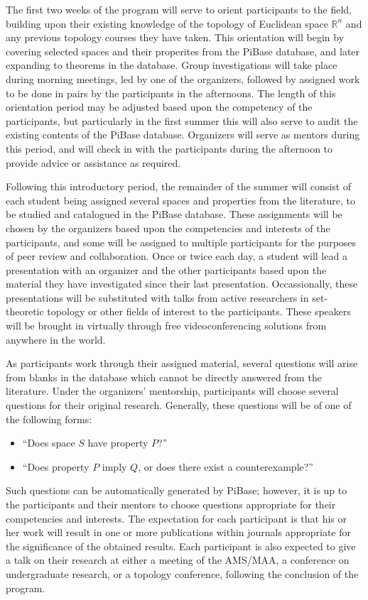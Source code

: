   The first two weeks of the program will serve to orient participants
  to the field, building upon their existing knowledge of the topology of
  Euclidean space \(\mathbb R^n\) and any previous topology courses they
  have taken. This orientation will begin by covering selected
  spaces and their properites from the PiBase database,
  and later expanding to theorems in the database. Group investigations will
  take place during morning meetings, led by one of the organizers, followed
  by assigned work to be done in pairs by the participants in the afternoons.
  The length of this orientation period may be adjusted based upon the
  competency of the participants, but particularly in the first summer this
  will also serve to audit the existing contents of the PiBase database.
  Organizers will serve as mentors during this period, and will check in
  with the participants during the afternoon to provide advice or assistance
  as required.

  Following this introductory period, the remainder of the summer will
  consist of each student being assigned several spaces and properties
  from the literature,
  to be studied and catalogued in the PiBase database. These assignments
  will be chosen by the organizers
  based upon the competencies and interests of the participants, and some
  will be assigned to multiple participants for the purposes of peer review
  and collaboration. Once or twice each day,
  a student will lead a presentation with an
  organizer and the other participants based upon the material they have
  investigated since their last presentation. Occassionally, these presentations
  will be substituted with talks from active researchers in set-theoretic topology
  or other fields of interest to the participants. These speakers will
  be brought in virtually through free
  videoconferencing solutions from anywhere in the world.

  As participants work through their assigned material, several questions will
  arise from blanks in the database which cannot be directly
  answered from the literature.
  Under the organizers' mentorship, participants will choose several questions
  for their original research. Generally, these questions will be of one of the
  following forms:
  \begin{itemize}
    \item ``Does space \(S\) have property \(P\)?''
    \item ``Does property \(P\) imply \(Q\), or does there exist a counterexample?''
  \end{itemize}
  Such questions can be automatically generated by PiBase; however, it is up
  to the participants and their mentors to choose questions appropriate for
  their competencies and interests. The expectation for each participant
  is that his or her work will result in one or more publications within
  journals appropriate for the significance of the obtained results. Each
  participant is also expected to give a talk on their research
  at either a meeting of the AMS/MAA, a conference on undergraduate research,
  or a topology conference, following the conclusion of the program.

